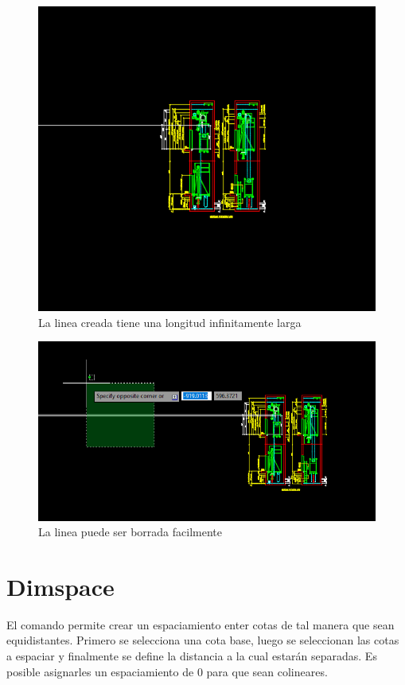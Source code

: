 \documentclass[12pt,letterpaper,final]{report}
\begin{document}
\begin{figure}[H]
	\centering
	\includegraphics[width=0.85\linewidth, height=0.5\textheight,keepaspectratio]{Imagenes/autocad_ray03}
	\caption{La linea creada tiene una longitud infinitamente larga}
	\label{fig:autocadray03}
\end{figure}

\begin{figure}[H]
	\centering
	\includegraphics[width=0.85\linewidth, height=0.5\textheight,keepaspectratio]{Imagenes/autocad_ray04}
	\caption{La linea puede ser borrada facilmente}
	\label{fig:autocadray04}
\end{figure}


\chapter{Dimspace}

El comando permite crear un espaciamiento enter cotas de tal manera que sean equidistantes. Primero se selecciona una cota base, luego se seleccionan las cotas a espaciar y finalmente se define la distancia a la cual estarán separadas. Es posible asignarles un espaciamiento de 0 para que sean colineares.
\end{document}
